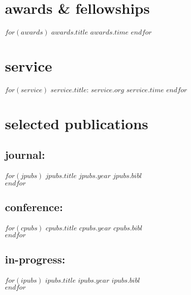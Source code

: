 \documentclass[]{friggeri-cv}
\begin{document}
\vspace{-0.05in}
\section{awards \& fellowships}
\begin{itemize}[noitemsep, leftmargin=0.55in]
$for(awards)$
  \entryitem
  {$awards.title$}
  {$awards.time$}
$endfor$
\end{itemize}



\vspace{-0.05in}
\section{service}
\begin{itemize}[noitemsep, leftmargin=0.55in]
$for(service)$
  \entryitem
  {$service.title$: $service.org$}
  {$service.time$}
$endfor$
\end{itemize}



\vspace{-0.05in}
\section{selected publications}

\vspace{-0.05in}
\subsection{journal:}
\begin{entrylist}
$for(jpubs)$
  \entrypub
  {$jpubs.title$}
  {$jpubs.year$}
  {$jpubs.bibl$}\\
$endfor$
\end{entrylist}

\vspace{-0.15in}
\subsection{conference:}
\begin{entrylist}
$for(cpubs)$
  \entrypub
  {$cpubs.title$}
  {$cpubs.year$}
  {$cpubs.bibl$}\\
$endfor$
\end{entrylist}

\vspace{-0.15in}
\subsection{in-progress:}
\begin{entrylist}
$for(ipubs)$
  \entrypub
  {$ipubs.title$}
  {$ipubs.year$}
  {$ipubs.bibl$}\\
$endfor$
\end{entrylist}



\end{document}
